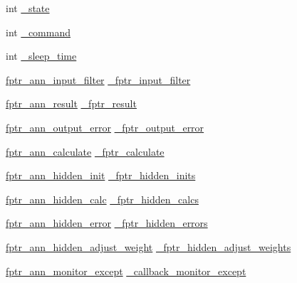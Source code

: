 \begin{DoxyCompactItemize}
\item 
int \hyperlink{classnanai_1_1nanai__ann__nanncalc_a1b2991833f76b5400e371f01ad7c6bbc}{\+\_\+state}
\item 
int \hyperlink{classnanai_1_1nanai__ann__nanncalc_a9834cef878366ef0bab79c5538a9f3be}{\+\_\+command}
\item 
int \hyperlink{classnanai_1_1nanai__ann__nanncalc_ad5c0182fd45d65dd7d91439d4eec6119}{\+\_\+sleep\+\_\+time}
\item 
\hyperlink{namespacenanai_a681d28f80aa95597ffc268b3b01abcfc}{fptr\+\_\+ann\+\_\+input\+\_\+filter} \hyperlink{classnanai_1_1nanai__ann__nanncalc_abebe28725dd1424ef5cd915f0146f56c}{\+\_\+fptr\+\_\+input\+\_\+filter}
\item 
\hyperlink{namespacenanai_ab737ac3c4f32f96a8ee6400db1c5a90f}{fptr\+\_\+ann\+\_\+result} \hyperlink{classnanai_1_1nanai__ann__nanncalc_afdaafe5d48d6590d9c38b020452eabce}{\+\_\+fptr\+\_\+result}
\item 
\hyperlink{namespacenanai_a5e697a4846a90e7e161e1d2d5be57688}{fptr\+\_\+ann\+\_\+output\+\_\+error} \hyperlink{classnanai_1_1nanai__ann__nanncalc_ac3d0e7fa0ac6210163391e0971f306cb}{\+\_\+fptr\+\_\+output\+\_\+error}
\item 
\hyperlink{namespacenanai_ac1a3ebd721fc3cfe1b9accfe7b65b7fe}{fptr\+\_\+ann\+\_\+calculate} \hyperlink{classnanai_1_1nanai__ann__nanncalc_afc0f3e68d5bc6d690d77f7ec938b2586}{\+\_\+fptr\+\_\+calculate}
\item 
\hyperlink{namespacenanai_a5fc4ff646e59919360af1ef410fe9671}{fptr\+\_\+ann\+\_\+hidden\+\_\+init} \hyperlink{classnanai_1_1nanai__ann__nanncalc_a8c430665e02d65d174eac790bb163341}{\+\_\+fptr\+\_\+hidden\+\_\+inits}
\item 
\hyperlink{namespacenanai_a299d9093f72831a48d205e94e200690c}{fptr\+\_\+ann\+\_\+hidden\+\_\+calc} \hyperlink{classnanai_1_1nanai__ann__nanncalc_a37c34eacc9c875653b79b4636596d4d3}{\+\_\+fptr\+\_\+hidden\+\_\+calcs}
\item 
\hyperlink{namespacenanai_aa8cd8d38cbd0a27e2818f132a3cfa2a2}{fptr\+\_\+ann\+\_\+hidden\+\_\+error} \hyperlink{classnanai_1_1nanai__ann__nanncalc_a6b4c7a5a93bd5d46f4ef78f5256963c7}{\+\_\+fptr\+\_\+hidden\+\_\+errors}
\item 
\hyperlink{namespacenanai_a1d9a4524c199b1a2891e208ce4b05306}{fptr\+\_\+ann\+\_\+hidden\+\_\+adjust\+\_\+weight} \hyperlink{classnanai_1_1nanai__ann__nanncalc_a90ca7f0507edefeb6c2b14641bbee7e9}{\+\_\+fptr\+\_\+hidden\+\_\+adjust\+\_\+weights}
\item 
\hyperlink{namespacenanai_ad9527fac6e647a6c149e4f9a8681e4c1}{fptr\+\_\+ann\+\_\+monitor\+\_\+except} \hyperlink{classnanai_1_1nanai__ann__nanncalc_a34ae5583c27674e94782b1491732139c}{\+\_\+callback\+\_\+monitor\+\_\+except}

\end{DoxyCompactItemize}
